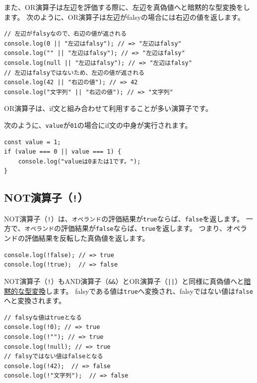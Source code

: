 また、OR演算子は左辺を評価する際に、左辺を真偽値へと暗黙的な型変換をします。
次のように、OR演算子は左辺がfalsyの場合には右辺の値を返します。

\begin{lstlisting}
// 左辺がfalsyなので、右辺の値が返される
console.log(0 || "左辺はfalsy"); // => "左辺はfalsy"
console.log("" || "左辺はfalsy"); // => "左辺はfalsy"
console.log(null || "左辺はfalsy"); // => "左辺はfalsy"
// 左辺はfalsyではないため、左辺の値が返される
console.log(42 || "右辺の値"); // => 42
console.log("文字列" || "右辺の値"); // => "文字列"
\end{lstlisting}

OR演算子は、if文と組み合わせて利用することが多い演算子です。

次のように、\texttt{value}が\texttt{0}\textbf{}\texttt{1}の場合にif文の中身が実行されます。

\begin{lstlisting}
const value = 1;
if (value === 0 || value === 1) {
    console.log("valueは0または1です。");
}
\end{lstlisting}

\hypertarget{not-operator}{%
\subsection{NOT演算子（\texttt{!}）}\label{not-operator}}

NOT演算子（\texttt{!}）は、\texttt{オペランド}の評価結果が\texttt{true}ならば、\texttt{false}を返します。
一方で、\texttt{オペランド}の評価結果が\texttt{false}ならば、\texttt{true}を返します。
つまり、オペランドの評価結果を反転した真偽値を返します。

\begin{lstlisting}
console.log(!false); // => true
console.log(!true);  // => false
\end{lstlisting}

NOT演算子（\texttt{!}）もAND演算子（\texttt{\&\&}）とOR演算子（\texttt{||}）と同様に真偽値へと\hyperlink{implicit-coercion}{暗黙的な型変換}します。
falsyである値は\texttt{true}へ変換され、falsyではない値は\texttt{false}へと変換されます。

\begin{lstlisting}
// falsyな値はtrueとなる
console.log(!0); // => true
console.log(!""); // => true
console.log(!null); // => true
// falsyではない値はfalseとなる
console.log(!42);  // => false
console.log(!"文字列");  // => false
\end{lstlisting}

